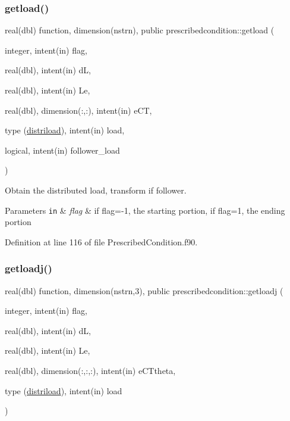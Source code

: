 \subsubsection{\texorpdfstring{getload()}{getload()}}
{\footnotesize\ttfamily real(dbl) function, dimension(nstrn), public prescribedcondition\+::getload (\begin{DoxyParamCaption}\item[{integer, intent(in)}]{flag,  }\item[{real(dbl), intent(in)}]{dL,  }\item[{real(dbl), intent(in)}]{Le,  }\item[{real(dbl), dimension(\+:,\+:), intent(in)}]{e\+CT,  }\item[{type (\hyperlink{structprescribedcondition_1_1distriload}{distriload}), intent(in)}]{load,  }\item[{logical, intent(in)}]{follower\+\_\+load }\end{DoxyParamCaption})}



Obtain the distributed load, transform if follower. 


\begin{DoxyParams}[1]{Parameters}
\mbox{\tt in}  & {\em flag} & if flag=-\/1, the starting portion, if flag=1, the ending portion \\
\hline
\end{DoxyParams}


Definition at line 116 of file Prescribed\+Condition.\+f90.

\mbox{\label{namespaceprescribedcondition_aa1915c03ae6332a4fa577bcbc8ca2a68}} 
\subsubsection{\texorpdfstring{getloadj()}{getloadj()}}
{\footnotesize\ttfamily real(dbl) function, dimension(nstrn,3), public prescribedcondition\+::getloadj (\begin{DoxyParamCaption}\item[{integer, intent(in)}]{flag,  }\item[{real(dbl), intent(in)}]{dL,  }\item[{real(dbl), intent(in)}]{Le,  }\item[{real(dbl), dimension(\+:,\+:,\+:), intent(in)}]{e\+C\+Ttheta,  }\item[{type (\hyperlink{structprescribedcondition_1_1distriload}{distriload}), intent(in)}]{load }\end{DoxyParamCaption})}



